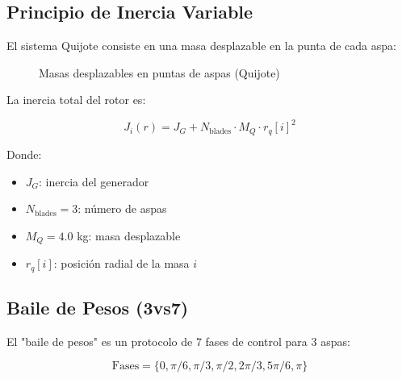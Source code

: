 \documentclass[12pt,a4paper]{article}
\begin{document}
\subsection{Principio de Inercia Variable}

El sistema Quijote consiste en una masa desplazable en la punta de cada aspa:

\begin{figure}[H]
\centering
{}
\caption{Masas desplazables en puntas de aspas (Quijote)}
\label{fig:quijote}
\end{figure}

La inercia total del rotor es:

\begin{equation}
J_i(r) = J_G + N_{\text{blades}} \cdot M_Q \cdot r_q[i]^2
\end{equation}

Donde:
\begin{itemize}
    \item $J_G$: inercia del generador
    \item $N_{\text{blades}} = 3$: número de aspas
    \item $M_Q = 4.0$ kg: masa desplazable
    \item $r_q[i]$: posición radial de la masa $i$
\end{itemize}

\subsection{Baile de Pesos (3vs7)}

El "baile de pesos" es un protocolo de 7 fases de control para 3 aspas:

\begin{equation}
\text{Fases} = \{0, \pi/6, \pi/3, \pi/2, 2\pi/3, 5\pi/6, \pi\}
\end{equation}
\end{document}
